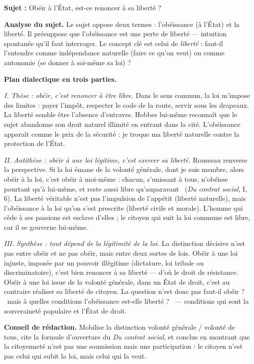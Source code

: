\documentclass[11pt]{article}
\begin{document}
\begin{exoresolu}
\textbf{Sujet :} \guillemotleft Obéir à l'État, est-ce renoncer à sa liberté ? \guillemotright

\tcblower

\textbf{Analyse du sujet.} Le sujet oppose deux termes : l'obéissance (à l'État) et la liberté. Il présuppose que l'obéissance est une perte de liberté — intuition spontanée qu'il faut interroger. Le concept clé est celui de \emph{liberté} : faut-il l'entendre comme indépendance naturelle (faire ce qu'on veut) ou comme autonomie (se donner à soi-même sa loi) ?

\textbf{Plan dialectique en trois parties.}

\emph{I. Thèse : obéir, c'est renoncer à être libre.} Dans le sens commun, la loi m'impose des limites : payer l'impôt, respecter le code de la route, servir sous les drapeaux. La liberté semble être l'absence d'entraves. Hobbes lui-même reconnaît que le sujet abandonne son droit naturel illimité en entrant dans la cité. L'obéissance apparaît comme le prix de la sécurité : je troque ma liberté naturelle contre la protection de l'État.

\emph{II. Antithèse : obéir à une loi légitime, c'est exercer sa liberté.} Rousseau renverse la perspective. Si la loi émane de la volonté générale, dont je suis membre, alors obéir à la loi, c'est obéir à moi-même : \guillemotleft chacun, s'unissant à tous, n'obéisse pourtant qu'à lui-même, et reste aussi libre qu'auparavant \guillemotright\ (\emph{Du contrat social}, I, 6). La liberté véritable n'est pas l'impulsion de l'appétit (liberté naturelle), mais l'obéissance à la loi qu'on s'est prescrite (liberté civile et morale). L'homme qui cède à ses passions est esclave d'elles ; le citoyen qui suit la loi commune est libre, car il se gouverne lui-même.

\emph{III. Synthèse : tout dépend de la légitimité de la loi.} La distinction décisive n'est pas entre obéir et ne pas obéir, mais entre deux sortes de lois. Obéir à une loi injuste, imposée par un pouvoir illégitime (dictature, loi tribale ou discriminatoire), c'est bien renoncer à sa liberté — d'où le droit de résistance. Obéir à une loi issue de la volonté générale, dans un État de droit, c'est au contraire réaliser sa liberté de citoyen. La question n'est donc pas \guillemotleft faut-il obéir ? \guillemotright\ mais \guillemotleft à quelles conditions l'obéissance est-elle liberté ? \guillemotright\ — conditions qui sont la souveraineté populaire et l'État de droit.

\textbf{Conseil de rédaction.} Mobilise la distinction volonté générale / volonté de tous, cite la formule d'ouverture du \emph{Du contrat social}, et conclus en montrant que la citoyenneté n'est pas une soumission mais une participation : le citoyen n'est pas celui qui subit la loi, mais celui qui la veut.
\end{exoresolu}
\end{document}
